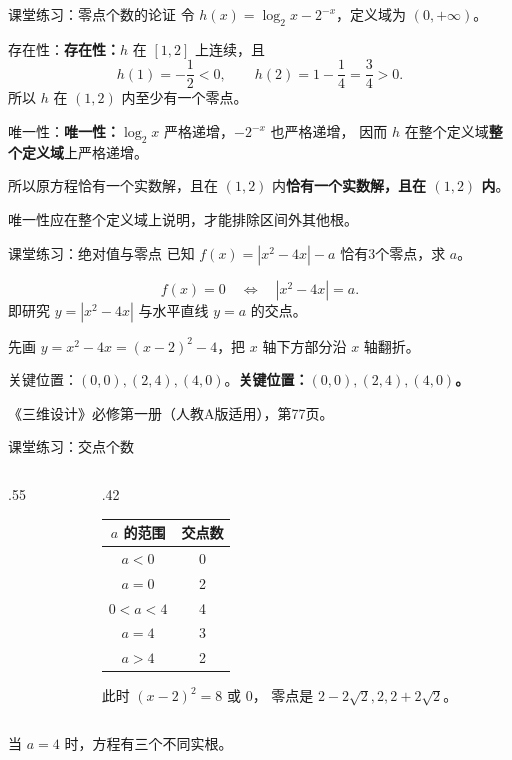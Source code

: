 \documentclass[aspectratio=169,10pt,handout]{beamer}
\newcommand{\key}[1]{{\ifmmode#1\else\bfseries #1\fi}}
\newcommand{\src}[1]{\par\vfill{\color{gray}\scriptsize #1}\par}
\newcommand{\gap}{\par\vspace{2mm}}
\begin{document}
\begin{frame}[t]{课堂练习：零点个数的论证}
  \large
  令 $h(x)=\log_2x-2^{-x}$，定义域为 $(0,+\infty)$。
  \pause
  \gap
  \key{存在性：}$h$ 在 $[1,2]$ 上连续，且
  \[h(1)=-\frac12<0,\qquad h(2)=1-\frac14=\frac34>0.\]
  所以 $h$ 在 $(1,2)$ 内至少有一个零点。
  \pause
  \gap
  \key{唯一性：}$\log_2x$ 严格递增，$-2^{-x}$ 也严格递增，
  因而 $h$ 在\key{整个定义域}上严格递增。
  \gap
  所以原方程\key{恰有一个实数解，且在 $(1,2)$ 内}。
  \src{唯一性应在整个定义域上说明，才能排除区间外其他根。}
\end{frame}

\begin{frame}[t]{课堂练习：绝对值与零点}
  \large
  已知 $f(x)=|x^2-4x|-a$ 恰有3个零点，求 $a$。
  \pause
  \gap
  \[f(x)=0\quad\Longleftrightarrow\quad |x^2-4x|=a.\]
  即研究 $y=|x^2-4x|$ 与水平直线 $y=a$ 的交点。
  \gap
  先画 $y=x^2-4x=(x-2)^2-4$，把 $x$ 轴下方部分沿 $x$ 轴翻折。
  \gap
  \key{关键位置：$(0,0),(2,4),(4,0)$。}
  \src{《三维设计》必修第一册（人教A版适用），第77页。}
\end{frame}

\begin{frame}[t]{课堂练习：交点个数}
  \begin{columns}[T,onlytextwidth]
  \begin{column}{.55\textwidth}
  \end{column}
  \begin{column}{.42\textwidth}
    \large
    \begin{tabular}{c|c}
      $a$ 的范围 & 交点数\\\hline
      $a<0$ & 0\\
      $a=0$ & 2\\
      $0<a<4$ & 4\\
      $a=4$ & 3\\
      $a>4$ & 2
    \end{tabular}
    \pause
    \gap\key{因此 $a=4$。}
    \gap\small 此时 $(x-2)^2=8$ 或 $0$，
    零点是 $2-2\sqrt2,2,2+2\sqrt2$。
  \end{column}
  \end{columns}
  \src{当 $a=4$ 时，方程有三个不同实根。}
\end{frame}
\end{document}
